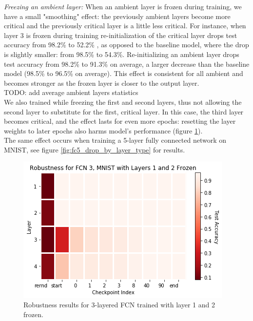 \documentclass{article}
\begin{document}
\emph{Freezing an ambient layer:} When  an ambient layer is frozen during training, we have a small "smoothing" effect: the previously ambient layers become more critical and the previously critical layer is a little less critical. For instance, when layer 3 is frozen during training re-initialization of the critical layer drops test accuracy from 98.2\% to 52.2\% , as opposed to the baseline model, where the drop is slightly smaller: from 98.5\% to 54.3\%. Re-initializing an ambient layer drops test accuracy from 98.2\% to 91.3\% on average, a larger decrease than the baseline model (98.5\% to 96.5\% on average). This effect is consistent for all ambient and becomes stronger as the frozen layer is closer to the output layer.\\    TODO: add average ambient layers statistics\\
We also trained while freezing the first and second layers, thus not allowing the second layer to substitute for the first, critical layer. In this case, the third layer becomes critical, and the effect lasts for even more epochs: resetting the layer weights to later epochs also harms model's performance (figure \ref{fig:f12_fc3_heatmap}).\\
The same effect occurs when training a 5-layer fully connected network on MNIST, see figure \ref{fig:fc5_drop_by_layer_type} for results. \\
\begin{figure}
  \includegraphics[width=\linewidth]{images/f12_fc3_mnist_heatmap.png}
  \caption{Robustness results for 3-layered FCN trained with layer 1 and 2 frozen.}
  \label{fig:f12_fc3_heatmap}
\end{figure}
\end{document}
